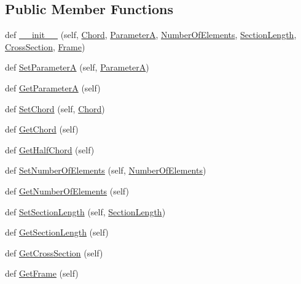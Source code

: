 \subsection*{Public Member Functions}
\begin{DoxyCompactItemize}
\item 
def \hyperlink{classgebtaero_1_1_wing_section_1_1_wing_section_aa313aa86c7d8588a0ce454b9268cf7a8}{\+\_\+\+\_\+init\+\_\+\+\_\+} (self, \hyperlink{classgebtaero_1_1_wing_section_1_1_wing_section_a844f4ac911b02212eb5c8a3d04bc2626}{Chord}, \hyperlink{classgebtaero_1_1_wing_section_1_1_wing_section_a0da2330696a15bce08b3ac29b2efaf17}{ParameterA}, \hyperlink{classgebtaero_1_1_wing_section_1_1_wing_section_a350cd9770457b51a9fc2d8c5a1171bf0}{Number\+Of\+Elements}, \hyperlink{classgebtaero_1_1_wing_section_1_1_wing_section_a87909d32978a886e9e329df69f7d918e}{Section\+Length}, \hyperlink{classgebtaero_1_1_cross_section_1_1_cross_section}{Cross\+Section}, \hyperlink{classgebtaero_1_1_frame_1_1_frame}{Frame})
\item 
def \hyperlink{classgebtaero_1_1_wing_section_1_1_wing_section_acb553aceb237ebac8cc046e4f4a46edf}{Set\+ParameterA} (self, \hyperlink{classgebtaero_1_1_wing_section_1_1_wing_section_a0da2330696a15bce08b3ac29b2efaf17}{ParameterA})
\item 
def \hyperlink{classgebtaero_1_1_wing_section_1_1_wing_section_adc79518e2f548a3aaee672b9206a83f4}{Get\+ParameterA} (self)
\item 
def \hyperlink{classgebtaero_1_1_wing_section_1_1_wing_section_a8371272d51d0381a5a39213aee9b1814}{Set\+Chord} (self, \hyperlink{classgebtaero_1_1_wing_section_1_1_wing_section_a844f4ac911b02212eb5c8a3d04bc2626}{Chord})
\item 
def \hyperlink{classgebtaero_1_1_wing_section_1_1_wing_section_a8221f8451dd85532c56dc9b2c1a2cd02}{Get\+Chord} (self)
\item 
def \hyperlink{classgebtaero_1_1_wing_section_1_1_wing_section_a2f91e7d10247a836983ad07c09130788}{Get\+Half\+Chord} (self)
\item 
def \hyperlink{classgebtaero_1_1_wing_section_1_1_wing_section_ad10719c65734570b888b9ab60431bf87}{Set\+Number\+Of\+Elements} (self, \hyperlink{classgebtaero_1_1_wing_section_1_1_wing_section_a350cd9770457b51a9fc2d8c5a1171bf0}{Number\+Of\+Elements})
\item 
def \hyperlink{classgebtaero_1_1_wing_section_1_1_wing_section_a04c09389662d9c6d3cc34032296dd03e}{Get\+Number\+Of\+Elements} (self)
\item 
def \hyperlink{classgebtaero_1_1_wing_section_1_1_wing_section_ab34adcbd5dd0ad028a03fa6e3581afef}{Set\+Section\+Length} (self, \hyperlink{classgebtaero_1_1_wing_section_1_1_wing_section_a87909d32978a886e9e329df69f7d918e}{Section\+Length})
\item 
def \hyperlink{classgebtaero_1_1_wing_section_1_1_wing_section_a55b1955062f73aea55c508427f9491bf}{Get\+Section\+Length} (self)
\item 
def \hyperlink{classgebtaero_1_1_wing_section_1_1_wing_section_aa8304c2d733dc66fba50fcb4b3f4a902}{Get\+Cross\+Section} (self)
\item 
def \hyperlink{classgebtaero_1_1_wing_section_1_1_wing_section_a8b0b0e7224ca8bd3b39dbb4fb159274e}{Get\+Frame} (self)
\end{DoxyCompactItemize}
